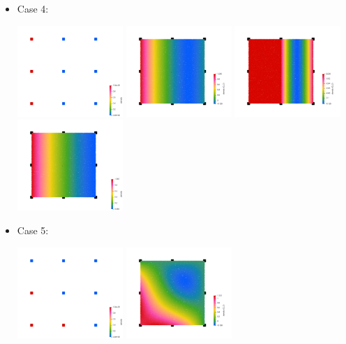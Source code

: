 \begin{itemize}
\begin{center}
\end{center}
\item Case 4:
\begin{center}
\includegraphics[width=4cm]{images/bernstein/nodes0003.png}
\includegraphics[width=4cm]{images/bernstein/rhoQ2_3.png}
\includegraphics[width=4cm]{images/bernstein/rhoQ2neg_3.png}
\includegraphics[width=4cm]{images/bernstein/rhoB2_3.png}\\
\end{center}
\item Case 5:
\begin{center}
\includegraphics[width=4cm]{images/bernstein/nodes0004.png}
\includegraphics[width=4cm]{images/bernstein/rhoQ2_4.png}

\end{center}
\end{itemize}
